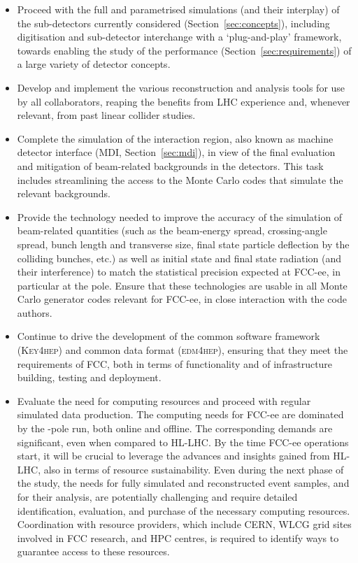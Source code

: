 \begin{itemize}

\item Proceed with the full and parametrised simulations (and their interplay) 
of the sub-detectors currently considered (Section~\ref{sec:concepts}), 
including digitisation and sub-detector interchange with a `plug-and-play' framework, 
towards enabling the study of the performance (Section~\ref{sec:requirements}) of a large variety of detector concepts.  

\item Develop and implement the various reconstruction and analysis tools for use by all collaborators, 
reaping the benefits from LHC experience and, whenever relevant, from past linear collider studies.

\item Complete the simulation of the interaction region,
also known as machine detector interface (MDI, Section~\ref{sec:mdi}),
in view of the final evaluation and mitigation of beam-related backgrounds in the detectors. 
This task includes streamlining the access to the Monte Carlo codes that simulate the relevant backgrounds.

\item Provide the technology needed to improve the accuracy of the simulation of beam-related quantities 
(such as the beam-energy spread, crossing-angle spread, bunch length and transverse size, 
final state particle deflection by the colliding bunches, etc.) 
as well as initial state and final state radiation (and their interference) 
to match the statistical precision expected at FCC-ee, in particular at the \PZ pole. 
Ensure that these technologies are usable in all Monte Carlo generator codes relevant for FCC-ee, 
in close interaction with the code authors.

\item Continue to drive the development of the common software framework (\textsc{Key4hep}) 
and common data format (\textsc{edm4hep}), 
ensuring that they meet the requirements of FCC, 
both in terms of functionality and of infrastructure building, testing and deployment.

\item Evaluate the need for computing resources and proceed with regular simulated data production. 
The computing needs for FCC-ee are dominated by the \PZ-pole run, both online and offline.
The corresponding demands are significant, even when compared to HL-LHC. 
By the time FCC-ee operations start, 
it will be crucial to leverage the advances and insights gained from HL-LHC, 
also in terms of resource sustainability. 
Even during the next phase of the study, 
the needs for fully simulated and reconstructed event samples, and for their analysis, 
are potentially challenging and require detailed identification, evaluation, and purchase of the necessary computing resources. 
Coordination with resource providers, which include CERN, WLCG grid sites involved in FCC research, and HPC centres, 
is required to identify ways to guarantee access to these resources.


\end{itemize}
